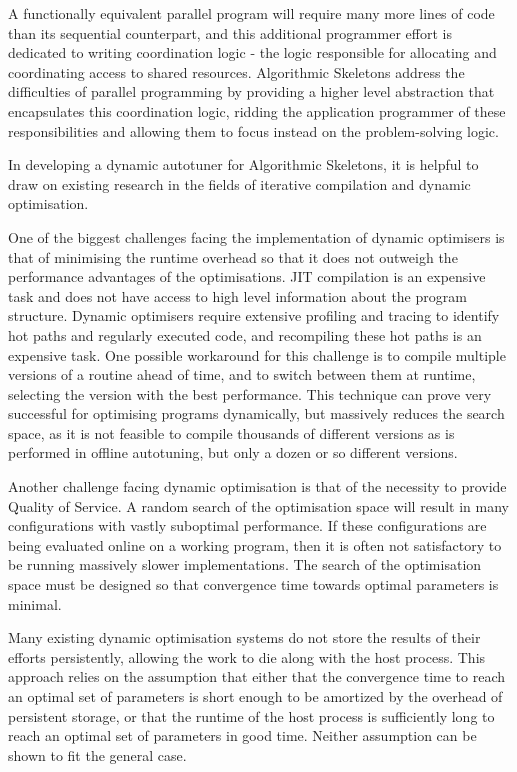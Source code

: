 A functionally equivalent parallel program will require many more
lines of code than its sequential counterpart, and this additional
programmer effort is dedicated to writing coordination logic - the
logic responsible for allocating and coordinating access to shared
resources. Algorithmic Skeletons address the difficulties of parallel
programming by providing a higher level abstraction that encapsulates
this coordination logic, ridding the application programmer of these
responsibilities and allowing them to focus instead on the
problem-solving logic.

In developing a dynamic autotuner for Algorithmic Skeletons, it is
helpful to draw on existing research in the fields of iterative
compilation and dynamic optimisation.

One of the biggest challenges facing the implementation of dynamic
optimisers is that of minimising the runtime overhead so that it does
not outweigh the performance advantages of the optimisations. JIT
compilation is an expensive task and does not have access to high
level information about the program structure. Dynamic optimisers
require extensive profiling and tracing to identify hot paths and
regularly executed code, and recompiling these hot paths is an
expensive task. One possible workaround for this challenge is to
compile multiple versions of a routine ahead of time, and to switch
between them at runtime, selecting the version with the best
performance. This technique can prove very successful for optimising
programs dynamically, but massively reduces the search space, as it is
not feasible to compile thousands of different versions as is
performed in offline autotuning, but only a dozen or so different
versions.

Another challenge facing dynamic optimisation is that of the necessity
to provide Quality of Service. A random search of the optimisation
space will result in many configurations with vastly suboptimal
performance. If these configurations are being evaluated online on a
working program, then it is often not satisfactory to be running
massively slower implementations. The search of the optimisation space
must be designed so that convergence time towards optimal parameters
is minimal.

Many existing dynamic optimisation systems do not store the results of
their efforts persistently, allowing the work to die along with the
host process. This approach relies on the assumption that either that
the convergence time to reach an optimal set of parameters is short
enough to be amortized by the overhead of persistent storage, or that
the runtime of the host process is sufficiently long to reach an
optimal set of parameters in good time. Neither assumption can be
shown to fit the general case.

